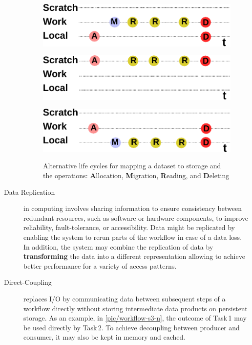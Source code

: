\documentclass{superfri}
\begin{document}
\begin{description}
\begin{figure}[b]
    \begin{minipage}{.33\linewidth}
        \centering
        \includegraphics[width=0.9\columnwidth]{pic/lifecycle-1}
        \label{fig:lifecycle1}
    \end{minipage}
    \begin{minipage}{.33\linewidth}
        \centering
        \includegraphics[width=0.9\columnwidth]{pic/lifecycle-2}
        \label{fig:lifecycle2}
    \end{minipage}
    \begin{minipage}{.33\linewidth}
        \centering
        \includegraphics[width=0.9\columnwidth]{pic/lifecycle-3}
        \label{fig:lifecycle3}
    \end{minipage}
    \vspace{5pt}
    \caption{Alternative life cycles for mapping a dataset to storage and the operations: \textbf{A}llocation, \textbf{M}igration, \textbf{R}eading, and \textbf{D}eleting}
    \label{fig:lifecycle}
\end{figure}

\item[Data Replication] in computing involves sharing information to ensure consistency between redundant resources, such as software or hardware components, to improve reliability, fault-tolerance, or accessibility.
Data might be replicated by enabling the system to rerun parts of the workflow in case of a data loss.
In addition, the system may combine the replication of data by \textbf{transforming} the data into a different representation allowing to achieve better performance for a variety of access patterns.

\item[Direct-Coupling] replaces I/O by communicating data between subsequent steps of a workflow directly without storing intermediate data products on persistent storage.
As an example, in \cref{pic/workflow-s3-n}, the outcome of Task\,1 may be used directly by Task\,2.
To achieve decoupling between producer and consumer, it may also be kept in memory and cached.
\end{description}
\end{document}
